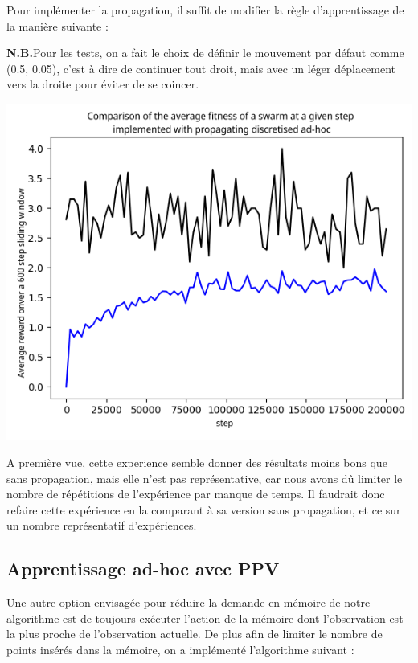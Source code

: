 \documentclass[a4paper, 12pt]{report}
\begin{document}
	Pour implémenter la propagation, il suffit de modifier la règle d'apprentissage de la manière suivante :
	
	
	
	\textbf{N.B.}Pour les tests, on a fait le choix de définir le mouvement par défaut comme (0.5, 0.05), c'est à dire de continuer tout droit, mais avec un léger déplacement vers la droite pour éviter de se coincer.

\begin{center}
	\includegraphics{D2Propag}
\end{center}	
A première vue, cette experience semble donner des résultats moins bons que sans propagation, mais elle n'est pas représentative, car nous avons dû limiter le nombre de répétitions de l'expérience par manque de temps. Il faudrait donc refaire cette expérience en la comparant à sa version sans propagation, et ce sur un nombre représentatif d'expériences.
	
	
	\subsection{Apprentissage ad-hoc avec PPV}
	Une autre option envisagée pour réduire la demande en mémoire de notre algorithme est de toujours exécuter l'action de la mémoire dont l'observation est la plus proche de l'observation actuelle.
	De plus afin de limiter le nombre de points insérés dans la mémoire, on a implémenté l'algorithme suivant :
\end{document}

